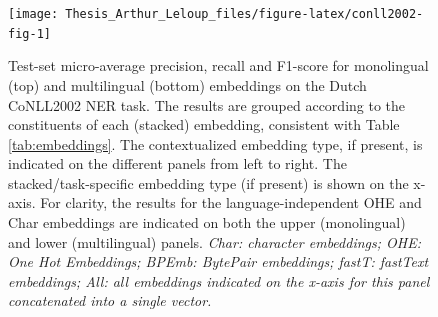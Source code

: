 \documentclass[12pt,a4paper,]{book}
\begin{document}
\begin{figure}

{\centering \texttt{[image: Thesis\_Arthur\_Leloup\_files/figure-latex/conll2002-fig-1]} 

}

\caption{Test-set micro-average precision, recall and F1-score for monolingual (top) and multilingual (bottom) embeddings on the Dutch CoNLL2002 NER task. The results are grouped according to the constituents of each (stacked) embedding, consistent with Table \ref{tab:embeddings}. The contextualized embedding type, if present, is indicated on the different panels from left to right. The stacked/task-specific embedding type (if present) is shown on the x-axis. For clarity, the results for the language-independent OHE and Char embeddings are indicated on both the upper (monolingual) and lower (multilingual) panels. \emph{Char: character embeddings; OHE: One Hot Embeddings; BPEmb: BytePair embeddings; fastT: fastText embeddings; All: all embeddings indicated on the x-axis for this panel concatenated into a single vector.}}\label{fig:conll2002-fig}
\end{figure}
\end{document}
